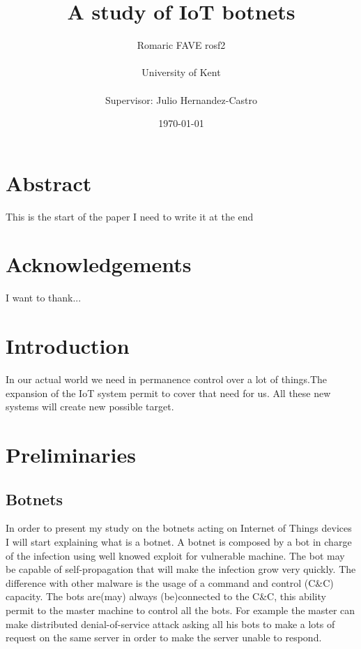 \documentclass{report}
\date{\monthyeardate\today}
\begin{document}
\title{A study of IoT botnets}
\author{Romaric FAVE rosf2\\
  \\
  University of Kent\\
  \\
  Supervisor: Julio Hernandez-Castro
}

\maketitle

\tableofcontents

\chapter*{Abstract}
This is the start of the paper I need to write it at the end

\chapter*{Acknowledgements}
I want to thank...

\chapter{Introduction}
In our actual world we need in permanence control over a lot of things.The expansion of the IoT system permit to cover that need for us. All these new systems will create new possible target. 

\chapter{Preliminaries}
\section{Botnets}
In order to present my study on the botnets acting on Internet of Things devices I will start explaining what is a botnet. A botnet is composed by a bot in charge of the infection using well knowed exploit for vulnerable machine. The bot may be capable of self-propagation that will make the infection grow very quickly. The difference with other malware is the usage of a command and control (C\&C) capacity. The bots are(may) always (be)connected to the C\&C, this ability permit to the master machine to control all the bots. For example the master can make distributed denial-of-service attack asking all his bots to make a lots of request on the same server in order to make the server unable to respond.
\end{document}
